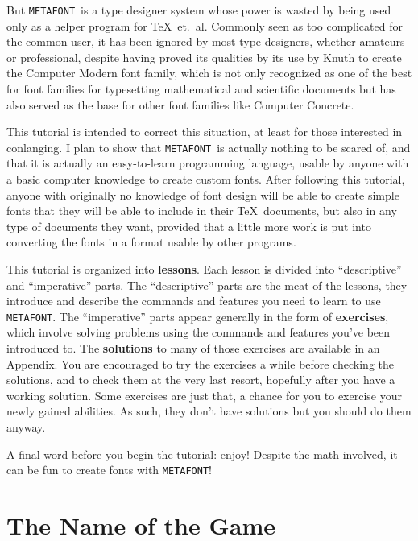 \documentclass[a4paper,11pt,twoside]{book}
\newcommand{\MF}{{\tt METAFONT}}
\begin{document}
But \MF\ is a type designer system whose power is wasted by being used only as a helper program
for \TeX\ et.~al.
Commonly seen as too complicated for the common user, it has been ignored by most type-designers,
whether amateurs or professional, despite having proved its qualities by its use by Knuth to
create the Computer Modern font family, which is not only recognized as one of the best for
font families for typesetting mathematical and scientific documents but has also served as the
base for other font families like Computer Concrete.

This tutorial is intended to correct this situation, at least for those interested in conlanging.
I plan to show that \MF\ is actually nothing to be scared of, and that it is actually an
easy-to-learn programming language, usable by anyone with a basic computer knowledge to create
custom fonts.
After following this tutorial, anyone with originally no knowledge of font design will be able to
create simple fonts that they will be able to include in their \TeX\ documents, but also in any
type of documents they want, provided that a little more work is put into converting the fonts in
a format usable by other programs.

This tutorial is organized into \textbf{lessons}.
Each lesson is divided into ``descriptive'' and ``imperative'' parts.
The ``descriptive'' parts are the meat of the lessons, they introduce and describe the commands
and features you need to learn to use \MF.
The ``imperative'' parts appear generally in the form of \textbf{exercises}, which involve solving
problems using the commands and features you've been introduced to.
The \textbf{solutions} to many of those exercises are available in an Appendix.
You are encouraged to try the exercises a while before checking the solutions, and to check them
at the very last resort, hopefully after you have a working solution.
Some exercises are just that, a chance for you to exercise your newly gained abilities.
As such, they don't have solutions but you should do them anyway.

A final word before you begin the tutorial: enjoy!
Despite the math involved, it can be fun to create fonts with \MF!

\tableofcontents

\mainmatter

\setcounter{chapter}{-1}
\chapter{The Name of the Game}
\end{document}
